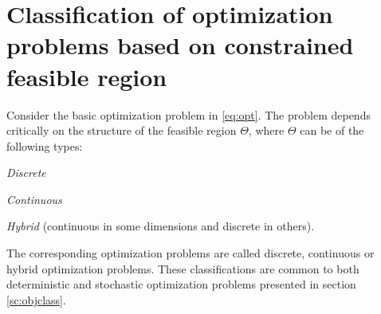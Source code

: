 \section{Classification of optimization problems based on constrained feasible region}
Consider the basic optimization problem in \eqref{eq:opt}. The problem depends critically on the structure of the feasible region $\Theta$, where $\Theta$ can be of the following types:

\begin{inparaenum}[\bfseries (i)]
 \item \emph{Discrete}
\item \emph{Continuous}
\item \emph{Hybrid} (continuous in some dimensions and discrete in others).
\end{inparaenum}
The corresponding optimization problems are called discrete, continuous or hybrid optimization problems. These classifications are common to both deterministic and stochastic optimization problems presented in section \ref{sc:objclass}. 

